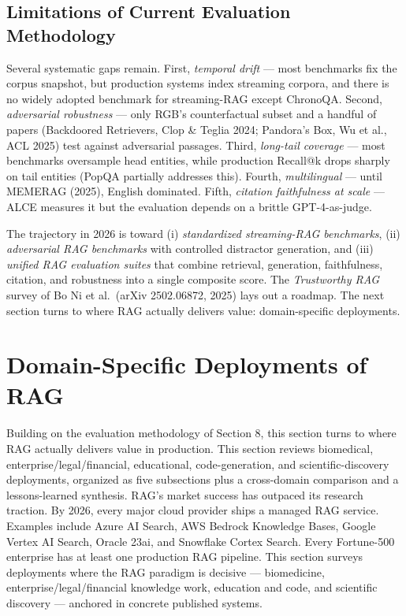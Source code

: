 \subsection{Limitations of Current Evaluation Methodology}\label{limitations-of-current-evaluation-methodology}

Several systematic gaps remain. First, \emph{temporal drift} --- most benchmarks fix the corpus snapshot, but production systems index streaming corpora, and there is no widely adopted benchmark for streaming-RAG except ChronoQA. Second, \emph{adversarial robustness} --- only RGB's counterfactual subset and a handful of papers (Backdoored Retrievers, Clop \& Teglia 2024; Pandora's Box, Wu et al., ACL 2025) test against adversarial passages. Third, \emph{long-tail coverage} --- most benchmarks oversample head entities, while production Recall@k drops sharply on tail entities (PopQA partially addresses this). Fourth, \emph{multilingual} --- until MEMERAG (2025), English dominated. Fifth, \emph{citation faithfulness at scale} --- ALCE measures it but the evaluation depends on a brittle GPT-4-as-judge.

The trajectory in 2026 is toward (i) \emph{standardized streaming-RAG benchmarks}, (ii) \emph{adversarial RAG benchmarks} with controlled distractor generation, and (iii) \emph{unified RAG evaluation suites} that combine retrieval, generation, faithfulness, citation, and robustness into a single composite score. The \emph{Trustworthy RAG} survey of Bo Ni et al.~(arXiv 2502.06872, 2025) lays out a roadmap. The next section turns to where RAG actually delivers value: domain-specific deployments.

\section{Domain-Specific Deployments of RAG}\label{domain-specific-deployments-of-rag}

Building on the evaluation methodology of Section 8, this section turns to where RAG actually delivers value in production. This section reviews biomedical, enterprise/legal/financial, educational, code-generation, and scientific-discovery deployments, organized as five subsections plus a cross-domain comparison and a lessons-learned synthesis. RAG's market success has outpaced its research traction. By 2026, every major cloud provider ships a managed RAG service. Examples include Azure AI Search, AWS Bedrock Knowledge Bases, Google Vertex AI Search, Oracle 23ai, and Snowflake Cortex Search. Every Fortune-500 enterprise has at least one production RAG pipeline. This section surveys deployments where the RAG paradigm is decisive --- biomedicine, enterprise/legal/financial knowledge work, education and code, and scientific discovery --- anchored in concrete published systems.


